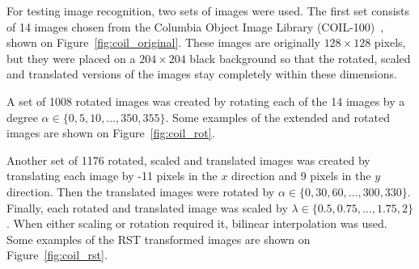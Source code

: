 For testing image recognition, two sets of images were used. The first set consists of 14 images chosen from the Columbia Object Image Library (COIL-100)~\cite{coil}, shown on Figure~\ref{fig:coil_original}. These images are originally $128 \times 128$ pixels, but they were placed on a $204 \times 204$ black background so that the rotated, scaled and translated versions of the images stay completely within these dimensions. 

A set of 1008 rotated images was created by rotating each of the 14 images by a degree $\alpha\in\{0,5,10,\ldots,350,355\}$. Some examples of the extended and rotated images are shown on Figure~\ref{fig:coil_rot}.

Another set of 1176 rotated, scaled and translated images was created by translating each image by -11 pixels in the $x$ direction and 9 pixels in the $y$ direction. Then the translated images were rotated by $\alpha \in \{0,30,60,\ldots,300,330\}$. Finally, each rotated and translated image was scaled by $\lambda \in \{0.5, 0.75, \ldots, 1.75, 2\}$. When either scaling or rotation required it, bilinear interpolation was used.
Some examples of the RST transformed images are shown on Figure~\ref{fig:coil_rst}.

